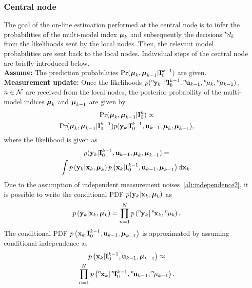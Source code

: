 \documentclass[conference,letterpaper]{IEEEtran}
\def\nth{\prescript{n\!}{}}
\begin{document}
\subsubsection{Central node}\label{sec:central_node}
The goal of the on-line estimation performed at the central node is to infer the probabilities of the multi-model index $\boldsymbol{\mu}_k$ and subsequently the decisions $\nth{d}_k$ from the likelihoods sent by the local nodes. 
Then, the relevant model probabilities are sent back to the local nodes.
Individual steps of the central node are briefly introduced below.\\
\textbf{Assume:} The prediction probabilities $\Pr(\boldsymbol{\mu}_{k},\boldsymbol{\mu}_{k-1}|\mathbf{I}_0^{k-1})$ are given.\\
\textbf{Measurement update:} Once the likelihoods $p(\nth{\bfy}_k\vert\nth{\bfI}_0^{k-1},\nth{\bfu}_{k-1},\nth{\mu}_k,\nth{\mu}_{k-1})$, $n\in\mathcal{N}$ are received from the local nodes, the posterior probability of the multi-model indices $\boldsymbol{\mu}_k$ and $\boldsymbol{\mu}_{k-1}$ are given by 
\begin{multline}\label{ali:Prob_Posterior}
	\Pr(\boldsymbol{\mu}_{k},\boldsymbol{\mu}_{k-1}|\mathbf{I}_0^{k}) \propto\\ \Pr(\boldsymbol{\mu}_{k},\boldsymbol{\mu}_{k-1}|\mathbf{I}_0^{k-1}) p(\mathbf{y}_{k}|\mathbf{I}_0^{k-1},\mathbf{u}_{k-1},\boldsymbol{\mu}_{k},\boldsymbol{\mu}_{k-1}),
\end{multline}
where  the likelihood is given as
\begin{multline}
	p(\mathbf{y}_{k}|\mathbf{I}_0^{k-1},\mathbf{u}_{k-1},\boldsymbol{\mu}_{k},\boldsymbol{\mu}_{k-1}) =\\
	\int p\left( \mathbf{y}_{k}|\mathbf{x}_{k},\boldsymbol{\mu}_{k} \right) p\left( \mathbf{x}_{k} |\mathbf{I}_{0}^{k-1},\mathbf{u}_{k-1},\boldsymbol{\mu}_{k-1} \right) \mathrm{d}\mathbf{x}_{k}.
\end{multline}
Due to the assumption of independent measurement noises~\eqref{ali:independence2}, it is possible to write the conditional PDF $p( \mathbf{y}_{k}|\mathbf{x}_{k},\boldsymbol{\mu}_{k} )$ as
\begin{align}
	p\left( \bfy_{k}|\bfx_{k},\bfmu_{k} \right) = \prod_{n=1}^{N} p\left( \nth{\bfy}_{k}|\nth{\bfx}_{k},\nth{\mu}_{k} \right).
\end{align}
The conditional PDF $p\left( \mathbf{x}_{k} |\mathbf{I}_{0}^{k-1},\mathbf{u}_{k-1},\boldsymbol{\mu}_{k-1} \right)$ is approximated by assuming conditional independence as
\begin{multline}
	p\left( \bfx_{k} |\bfI_{0}^{k-1},\bfu_{k-1},\bfmu_{k-1} \right) \approx\\
	\prod_{n=1}^{N} p\left( \nth{\bfx}_{k} | \nth{\bfI}_{0}^{k-1},\nth{\bfu}_{k-1},\nth{\mu}_{k-1} \right).
\end{multline}
\end{document}
